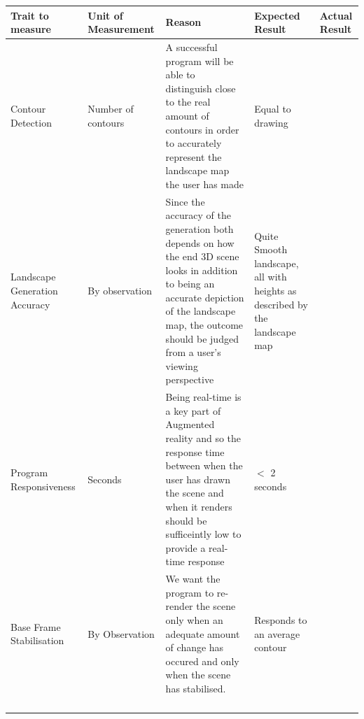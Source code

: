 \documentclass[11pt]{article}
\begin{document}
\newpage
\begin{landscape}
\begin{table}[h]
\begin{tabular}{p{}|p{}|p{}|p{}|p{}}
\hline \hline
Trait to measure & Unit of Measurement & Reason & Expected Result & Actual Result \\
\hline \hline
Contour Detection &  Number of contours & A successful program will be able to 
										distinguish close to the real amount of 
										contours in order to accurately represent the	
										landscape map the user 
													has made      & Equal to drawing&  			  \\
\hline
Landscape Generation
	Accuracy     & By observation	   & Since the accuracy of the generation both
										 depends on how the end 3D scene looks in 
										 addition to being an accurate depiction of
										 the landscape map, the outcome should be 
										 judged from a user's viewing perspective
										        & Quite Smooth landscape,
										          all with heights as described by
										          the landscape map &  			  \\
\hline
Program Responsiveness &  Seconds      & Being real-time is a key part of Augmented
									  	 reality and so the response time between 
									  	 when the user has drawn the scene and when it
									  	 renders should be sufficeintly low to 
									  	 provide a real-time response
									  	        &    $<$ 2 seconds       &  			  \\
\hline
Base Frame 
   Stabilisation & By Observation	   & We want the program to re-render the scene
   										 only when an adequate amount of change has 
   										 occured and only when the scene has 
   										 stabilised. & Responds to an average contour    &  			  \\
              
                 &                     &        &                 &  			  \\
                 &                     &        &                 &  			  \\
                 &                     &        &                 &  			  \\                                                                                                     
                 &                     &        &                 & 
\end{tabular}
\label{fig:TestMeasureTable}
\end{table}
\end{landscape}
\newpage
\end{document}
